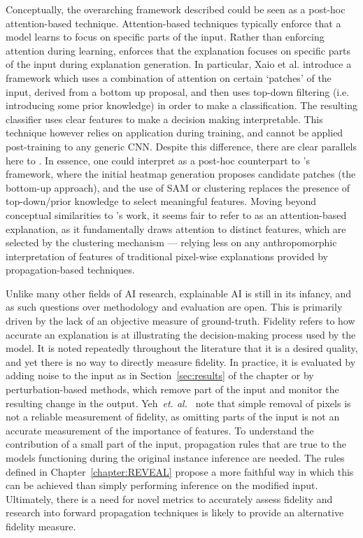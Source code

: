 Conceptually, the overarching framework described could be seen as a post-hoc attention-based technique. Attention-based techniques typically enforce that a model learns to focus on specific parts of the input. Rather than enforcing attention during learning, \CTC\/ enforces that the explanation focuses on specific parts of the input during explanation generation. In particular, Xaio et al. \cite{XiaoXYZPZ15} introduce a framework which uses a combination of attention on certain `patches' of the input, derived from a bottom up proposal, and then uses top-down filtering (i.e. introducing some prior knowledge) in order to make a classification. The resulting classifier uses clear features to make a decision making interpretable. This technique however relies on application during training, and cannot be applied post-training to any generic CNN. Despite this difference, there are clear parallels here to \CTC\/. In essence, one could interpret \CTC\/ as a post-hoc counterpart to \cite{XiaoXYZPZ15}'s framework, where the initial heatmap generation proposes candidate patches (the bottom-up approach), and the use of SAM or clustering replaces the presence of top-down/prior knowledge to select meaningful features. Moving beyond conceptual similarities to \cite{XiaoXYZPZ15}'s work, it seems fair to refer to \CTC\/ as an attention-based explanation, as it fundamentally draws attention to distinct features, which are selected by the clustering mechanism --- relying less on any anthropomorphic interpretation of features of traditional pixel-wise explanations provided by propagation-based techniques.


Unlike many other fields of AI research, explainable AI is still in its infancy, and as such questions over methodology and evaluation are open. This is primarily driven by the lack of an objective measure of ground-truth. Fidelity refers to how accurate an explanation is at illustrating the decision-making process used by the model. It is noted repeatedly throughout the literature that it is a desired quality, and yet there is no way to directly measure fidelity.  In practice, it is evaluated by adding noise to the input as in Section~\ref{sec:results} of the \CTC\/ chapter or by perturbation-based methods, which remove part of the input and monitor the resulting change in the output. Yeh~\textit{et. al.}~\cite{YehHSIR19} note that simple removal of pixels is not a reliable measurement of fidelity, as omitting parts of the input is not an accurate measurement of the importance of features. To understand the contribution of a small part of the input, propagation rules that are true to the models functioning during the original instance inference are needed. The rules defined in Chapter~\ref{chapter:REVEAL} propose a more faithful way in which this can be achieved than simply performing inference on the modified input. Ultimately, there is a need for novel metrics to accurately assess fidelity and research into forward propagation techniques is likely to provide an alternative fidelity measure. 

